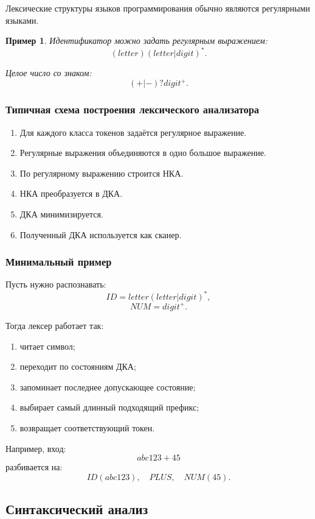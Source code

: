 \documentclass[12pt,a4paper]{article}
\newtheorem{example}{Пример}
\begin{document}
Лексические структуры языков программирования обычно являются регулярными языками.

\begin{example}
Идентификатор можно задать регулярным выражением:
\[
(letter)(letter|digit)^*.
\]

Целое число со знаком:
\[
(+|-)?digit^+.
\]
\end{example}

\subsubsection*{Типичная схема построения лексического анализатора}

\begin{enumerate}
    \item Для каждого класса токенов задаётся регулярное выражение.
    \item Регулярные выражения объединяются в одно большое выражение.
    \item По регулярному выражению строится НКА.
    \item НКА преобразуется в ДКА.
    \item ДКА минимизируется.
    \item Полученный ДКА используется как сканер.
\end{enumerate}

\subsubsection*{Минимальный пример}

Пусть нужно распознавать:
\[
ID=letter(letter|digit)^*,
\]
\[
NUM=digit^+.
\]

Тогда лексер работает так:
\begin{enumerate}
    \item читает символ;
    \item переходит по состояниям ДКА;
    \item запоминает последнее допускающее состояние;
    \item выбирает самый длинный подходящий префикс;
    \item возвращает соответствующий токен.
\end{enumerate}

Например, вход:
\[
abc123+45
\]
разбивается на:
\[
ID(abc123),\quad PLUS,\quad NUM(45).
\]

\subsection{Синтаксический анализ}
\end{document}
